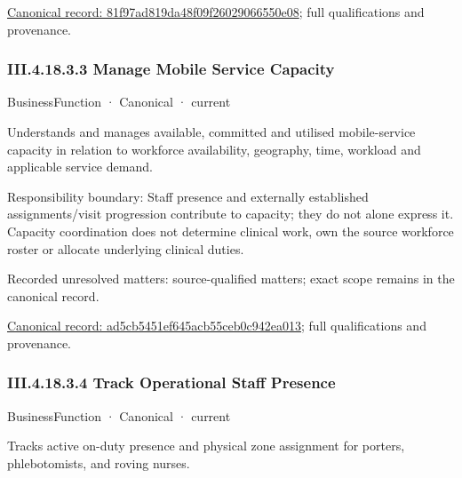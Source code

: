 {\footnotesize \href{../../../../../../../../continuum/business/business-function/81f97ad819da48f09f26029066550e08.md}{Canonical record: 81f97ad819da48f09f26029066550e08}; full qualifications and provenance.}\par
\subsubsection*{III.4.18.3.3 Manage Mobile Service Capacity}
\label{navigation:III.4.18.3.3}

\label{element:ad5cb5451ef645acb55ceb0c942ea013}
{\small BusinessFunction · Canonical · current}\par

Understands and manages available, committed and utilised mobile-service capacity in relation to workforce availability, geography, time, workload and applicable service demand.



Responsibility boundary: Staff presence and externally established assignments/visit progression contribute to capacity; they do not alone express it. Capacity coordination does not determine clinical work, own the source workforce roster or allocate underlying clinical duties.


{\small Recorded unresolved matters: source-qualified matters; exact scope remains in the canonical record.}\par
{\footnotesize \href{../../../../../../../../continuum/business/business-function/ad5cb5451ef645acb55ceb0c942ea013.md}{Canonical record: ad5cb5451ef645acb55ceb0c942ea013}; full qualifications and provenance.}\par
\subsubsection*{III.4.18.3.4 Track Operational Staff Presence}
\label{navigation:III.4.18.3.4}

\label{element:9ccdb235a69946e0ad5a99001a1d16e0}
{\small BusinessFunction · Canonical · current}\par

Tracks active on-duty presence and physical zone assignment for porters, phlebotomists, and roving nurses.



